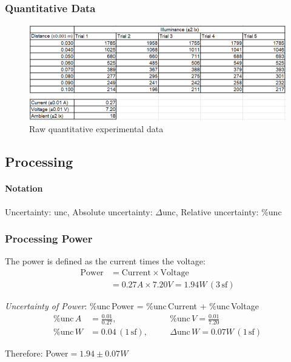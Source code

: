 \documentclass[a4paper,12pt]{article}
\newcommand{\absun}{\Delta \text{unc}\,}
\newcommand{\relun}{\% \text{unc}\,}
\newcommand{\tsf}{\,\text{sf}}
\begin{document}
\subsubsection*{Quantitative Data}
\begin{figure}[H]
    \centering
    \includegraphics[width=\textwidth]{assets/rawdata.png}
    \caption{Raw quantitative experimental data}
    \label{fig:raw}
\end{figure}

\subsection{Processing}
\paragraph{Notation}

Uncertainty: unc, Absolute uncertainty: $\Delta$unc, Relative uncertainty: \%unc


\subsubsection{Processing Power}
The power is defined as the current times the voltage:
\begin{align*}
\text{Power} &= \text{Current} \times \text{Voltage}\\
        &= 0.27\si{A} \times 7.20\si{V} = 1.94 \si{W} \,(3 \tsf)
\end{align*}

\textit{Uncertainty of Power}: $\relun$Power =  $\relun$Current +  $\relun$Voltage
\begin{alignat*}
    \relun \si{A} &= \frac{0.01}{0.27},\quad &&\relun \si{V} = \frac{0.01}{7.20}\\
    \relun \si{W} &= 0.04 \,(1 \tsf), \quad &&\absun \si{W} = 0.07\si{W} \,(1 \tsf)
\end{alignat*}

Therefore: Power$ = 1.94 \pm 0.07 \si{W}$
\end{document}

